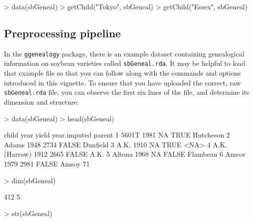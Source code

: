 \documentclass{article}
\numberwithin{equation}{section} %
\newcommand{\pkg}[1]{{\texttt{#1}}}
\begin{document}
\begin{Schunk}
\begin{Sinput}
> data(sbGeneal)
> getChild("Tokyo", sbGeneal)
> getChild("Essex", sbGeneal)
\end{Sinput}
\end{Schunk}

\subsection{Preprocessing pipeline}

In the \pkg{ggenealogy} package, there is an example dataset containing genealogical information on soybean varieties called \texttt{sbGeneal.rda}. It may be helpful to load that example file so that you can follow along with the commands and options introduced in this vignette. To ensure that you have uploaded the correct, raw \texttt{sbGeneal.rda} file, you can observe the first six lines of the file, and determine its dimension and structure:

\begin{Schunk}
\begin{Sinput}
> data(sbGeneal)
> head(sbGeneal)
\end{Sinput}
\begin{Soutput}
          child year yield year.imputed    parent
1         5601T 1981    NA         TRUE Hutcheson
2         Adams 1948  2734        FALSE  Dunfield
3          A.K. 1910    NA         TRUE      <NA>
4 A.K. (Harrow) 1912  2665        FALSE      A.K.
5        Altona 1968    NA        FALSE  Flambeau
6         Amcor 1979  2981        FALSE  Amsoy 71
\end{Soutput}
\begin{Sinput}
> dim(sbGeneal)
\end{Sinput}
\begin{Soutput}
[1] 412   5
\end{Soutput}
\begin{Sinput}
> str(sbGeneal)
\end{Sinput}
\end{Schunk}
\end{document}
